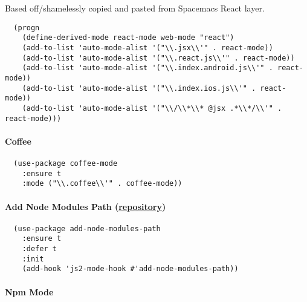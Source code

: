 \documentclass[11pt]{article}
\begin{document}
Based off/shamelessly copied and pasted from Spacemacs
React layer.

\begin{verbatim}
  (progn
    (define-derived-mode react-mode web-mode "react")
    (add-to-list 'auto-mode-alist '("\\.jsx\\'" . react-mode))
    (add-to-list 'auto-mode-alist '("\\.react.js\\'" . react-mode))
    (add-to-list 'auto-mode-alist '("\\.index.android.js\\'" . react-mode))
    (add-to-list 'auto-mode-alist '("\\.index.ios.js\\'" . react-mode))
    (add-to-list 'auto-mode-alist '("\\/\\*\\* @jsx .*\\*/\\'" . react-mode)))
\end{verbatim}

\paragraph*{Coffee}
\label{sec:org328eb87}

\begin{verbatim}
  (use-package coffee-mode
    :ensure t
    :mode ("\\.coffee\\'" . coffee-mode))
\end{verbatim}

\paragraph*{Add Node Modules Path (\href{https://github.com/codesuki/add-node-modules-path}{repository})}
\label{sec:org8c85111}

\begin{verbatim}
  (use-package add-node-modules-path
    :ensure t
    :defer t
    :init
    (add-hook 'js2-mode-hook #'add-node-modules-path))
\end{verbatim}

\paragraph*{Npm Mode}
\label{sec:org7d72b2b}
\end{document}
